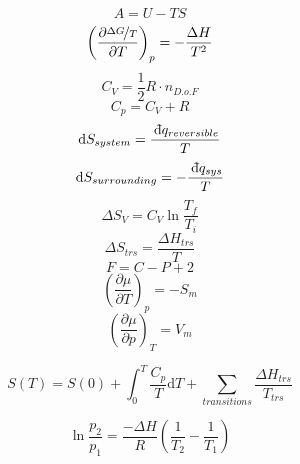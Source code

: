\documentclass[12pt, letterpaper]{memoir}
\begin{document}
\begin{minipage}{0.5\linewidth}
	\begin{equation*}
		A = U-TS
	\end{equation*}
	\begin{equation*}
		\left(\dfrac{\partial \nicefrac{\Delta G}{T}}{\partial T}\right)_p=-\dfrac{\Delta H}{T^2}
	\end{equation*}
	\begin{equation*}
		C_V = \dfrac{1}{2}R\cdot n_{D.o.F}
	\end{equation*}
	\begin{equation*}
		C_p = C_V+R
	\end{equation*}	
	\begin{equation*}
		\mathrm{d} S_{system} = \dfrac{~\dbar q_{reversible}}{T}
	\end{equation*}	
	\begin{equation*}
		\mathrm{d} S_{surrounding} = -\dfrac{~\dbar q_{sys}}{T}
	\end{equation*}	
	\begin{equation*}
		\Delta S_V=C_V\ln\dfrac{T_f}{T_i}
	\end{equation*}	
	\begin{equation*}
		\Delta S_{trs}=\dfrac{\Delta H_{trs}}{T}
	\end{equation*}
	\begin{equation*}
		F=C-P+2
	\end{equation*}
	\begin{equation*}
		\left(\dfrac{\partial \mu}{\partial T}\right)_p=-S_m
	\end{equation*}
	\begin{equation*}
		\left(\dfrac{\partial \mu}{\partial p}\right)_T=V_m
	\end{equation*}
\end{minipage}

\begin{equation*}
	S(T)=S(0)+\int_0^T\dfrac{C_p}{T}\mathrm{d}T+\sum\limits_{transitions}\dfrac{\Delta H_{trs}}{T_{trs}}
\end{equation*}	

\begin{equation*}
	\ln\dfrac{p_2}{p_1}=\dfrac{-\Delta H}{R}\left(\dfrac{1}{T_2}-\dfrac{1}{T_1}\right)
\end{equation*}
\end{document}
